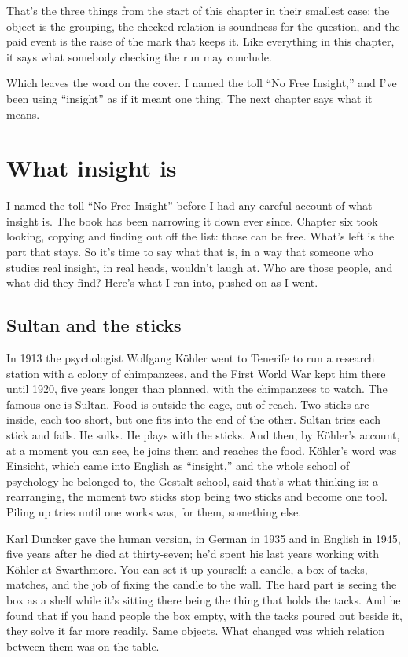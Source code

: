\documentclass[11pt,twoside]{article}
\theoremstyle{thielethm}
\theoremstyle{thieledef}
\theoremstyle{thieledef}
\theoremstyle{thieledef}
\theoremstyle{thielethm}
\theoremstyle{thieleobs}
\theoremstyle{thielethm}
\begin{document}
That's the three things from the start of this chapter in their smallest case: the object is the grouping, the checked relation is soundness for the question, and the paid event is the raise of the mark that keeps it. Like everything in this chapter, it says what somebody checking the run may conclude.

Which leaves the word on the cover. I named the toll ``No Free Insight,'' and I've been using ``insight'' as if it meant one thing. The next chapter says what it means.

\section{What insight is}
\label{sec:insight}

I named the toll ``No Free Insight'' before I had any careful account of what insight is. The book has been narrowing it down ever since. Chapter six took looking, copying and finding out off the list: those can be free. What's left is the part that stays. So it's time to say what that is, in a way that someone who studies real insight, in real heads, wouldn't laugh at. Who are those people, and what did they find? Here's what I ran into, pushed on as I went.

\subsection{Sultan and the sticks}

In 1913 the psychologist Wolfgang Köhler went to Tenerife to run a research station with a colony of chimpanzees, and the First World War kept him there until 1920, five years longer than planned, with the chimpanzees to watch. The famous one is Sultan. Food is outside the cage, out of reach. Two sticks are inside, each too short, but one fits into the end of the other. Sultan tries each stick and fails. He sulks. He plays with the sticks. And then, by Köhler's account, at a moment you can see, he joins them and reaches the food. Köhler's word was Einsicht, which came into English as ``insight,'' and the whole school of psychology he belonged to, the Gestalt school, said that's what thinking is: a rearranging, the moment two sticks stop being two sticks and become one tool. Piling up tries until one works was, for them, something else.

Karl Duncker gave the human version, in German in 1935 and in English in 1945, five years after he died at thirty-seven; he'd spent his last years working with Köhler at Swarthmore. You can set it up yourself: a candle, a box of tacks, matches, and the job of fixing the candle to the wall. The hard part is seeing the box as a shelf while it's sitting there being the thing that holds the tacks. And he found that if you hand people the box empty, with the tacks poured out beside it, they solve it far more readily. Same objects. What changed was which relation between them was on the table.
\end{document}
